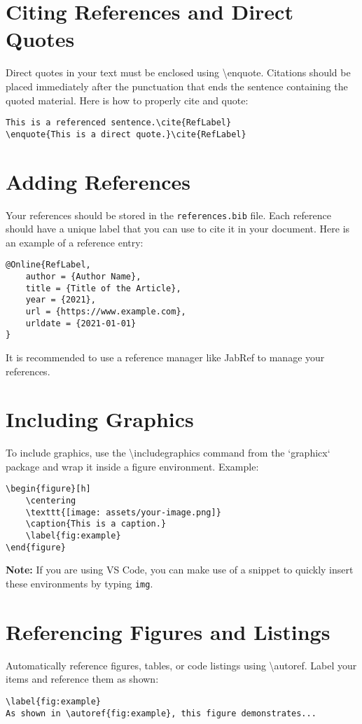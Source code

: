 \section{Citing References and Direct Quotes}
Direct quotes in your text must be enclosed using \textbackslash enquote{}. Citations should be placed immediately after the punctuation that ends the sentence containing the quoted material. Here is how to properly cite and quote:
\begin{verbatim}
This is a referenced sentence.\cite{RefLabel}
\enquote{This is a direct quote.}\cite{RefLabel}
\end{verbatim}

\section{Adding References}
Your references should be stored in the \texttt{references.bib} file. Each reference should have a unique label that you can use to cite it in your document. Here is an example of a reference entry:
\begin{verbatim}
@Online{RefLabel,
    author = {Author Name},
    title = {Title of the Article},
    year = {2021},
    url = {https://www.example.com},
    urldate = {2021-01-01}
}
\end{verbatim}

It is recommended to use a reference manager like JabRef to manage your references.

\section{Including Graphics}
To include graphics, use the \textbackslash includegraphics command from the `graphicx` package and wrap it inside a figure environment. Example:
\begin{verbatim}
\begin{figure}[h]
    \centering
    \texttt{[image: assets/your-image.png]}
    \caption{This is a caption.}
    \label{fig:example}
\end{figure}
\end{verbatim}

\textbf{Note:} If you are using VS Code, you can make use of a snippet to quickly insert these environments by typing \texttt{img}.


\section{Referencing Figures and Listings}
Automatically reference figures, tables, or code listings using \textbackslash autoref. Label your items and reference them as shown:
\begin{verbatim}
\label{fig:example}
As shown in \autoref{fig:example}, this figure demonstrates...
\end{verbatim}